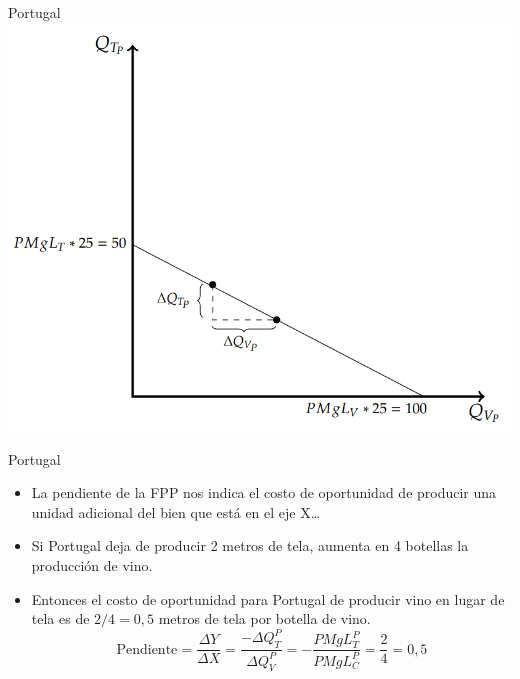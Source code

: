 \documentclass{beamer}
\begin{document}
\begin{frame}{Portugal}
    \centering
    \includegraphics[scale=0.6]{../Figures/C18.2.png}
\end{frame}

\begin{frame}{Portugal}
    \begin{itemize}
        \item La pendiente de la FPP nos indica el costo de oportunidad de producir una unidad adicional del bien que está en el eje X\dots
        \item Si Portugal deja de producir 2 metros de tela, aumenta en 4 botellas la producción de vino.
        \item Entonces el costo de oportunidad para Portugal de producir vino en lugar de tela es de $2/4 = 0,5$ metros de tela por botella de vino.
        \[ \text{Pendiente} = \frac{\Delta Y}{\Delta X} = \frac{- \Delta Q^{P}_T}{\Delta Q^{P}_V} = - \frac{PMgL_T^{P}}{PMgL_C^{P}} = \frac{2}{4} = 0,5 \]
    \end{itemize}
\end{frame}
\end{document}
